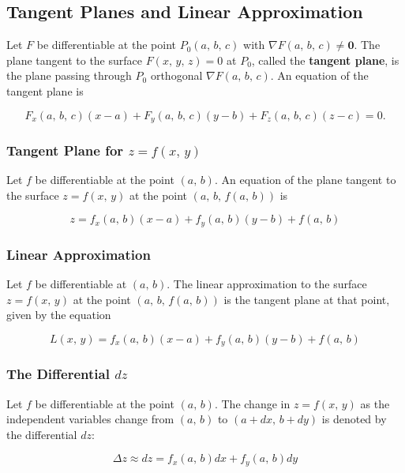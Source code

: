 \subsection{Tangent Planes and Linear Approximation}
Let $F$ be differentiable at the point $P_0 (a,\, b,\, c)$ with $\nabla F(a,\, b,\, c) \neq \mathbf{0}$. The plane tangent to the surface $F(x,\, y,\, z) = 0$ at $P_0$, called the \textbf{tangent plane}, is the plane passing through $P_0$ orthogonal $\nabla F(a,\, b,\, c)$. An equation of the tangent plane is

\begin{equation}
    F_x (a,\, b,\, c)(x - a) + F_y (a,\, b,\, c)(y - b) + F_z (a,\, b,\, c)(z - c) = 0.
\end{equation}

\subsubsection{Tangent Plane for $z = f(x,\, y)$}
Let $f$ be differentiable at the point $(a,\, b)$. An equation of the plane tangent to the surface $z = f(x,\, y)$ at the point $(a,\, b,\, f(a,\, b))$ is

\begin{equation}
    z = f_x (a,\, b)(x - a) + f_y (a,\, b)(y - b) + f(a,\, b)
\end{equation}

\subsubsection{Linear Approximation}
Let $f$ be differentiable at $(a,\, b)$. The linear approximation to the surface $z = f(x,\, y)$ at the point $(a,\, b,\, f(a,\, b))$ is the tangent plane at that point, given by the equation

\begin{equation}
    L(x,\, y) = f_x (a,\, b)(x - a) + f_y (a,\, b)(y - b) + f(a,\, b)
\end{equation}

\subsubsection{The Differential $dz$}
Let $f$ be differentiable at the point $(a,\, b)$. The change in $z = f(x,\, y)$ as the independent variables change from $(a,\, b)$ to $(a + dx,\, b + dy)$ is denoted by the differential $dz$:

\begin{equation}
    \Delta z \approx dz = f_x(a,\, b) dx + f_y(a,\, b) dy
\end{equation}
